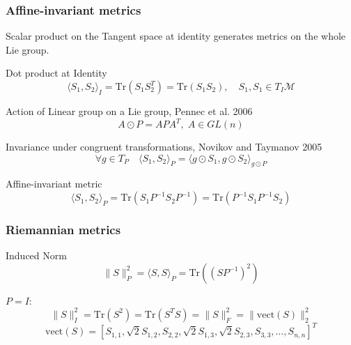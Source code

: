 \documentclass{beamer}
\begin{document}

\begin{frame}
\frametitle{Affine-invariant metrics}
Scalar product on the Tangent space at identity generates metrics on the whole Lie group. 
\begin{block}{Dot product at Identity}
	\begin{equation*}
	\langle S_1, S_2 \rangle_I = \text{Tr}(S_1 S_2^T) = \text{Tr}(S_1 S_2), \quad S_1, S_1 \in T_I \mathcal{M}
	\end{equation*}
\end{block}

\begin{block}{Action of Linear group on a Lie group, Pennec et al. 2006}
	\begin{equation*}
	 A \odot P = A P A^T, \; A\in GL(n)
	\end{equation*}
\end{block}

\begin{block}{Invariance under congruent transformations, Novikov and Taymanov 2005}
	\begin{equation*}
	\forall g \in T_P \quad 
	 \langle S_1, S_2 \rangle_P =  \langle g \odot S_1,g\odot  S_2 \rangle_{g \odot P}
	\end{equation*}
\end{block}

\begin{block}{Affine-invariant metric}
	\begin{equation*}
	\langle S_1, S_2 \rangle_P = \text{Tr}(S_1 P^{-1}S_2 P^{-1}) = \text{Tr}(P^{-1}S_1 P^{-1}S_2)
	\end{equation*}
\end{block}
\end{frame}


\begin{frame}
\frametitle{Riemannian metrics}
\begin{block}{Induced Norm}
	\begin{equation*}
	\|S \|_P^2 = 	\langle S, S \rangle_P  = \text{Tr}((S P^{-1})^2)
	\end{equation*}
\end{block}

$P = I:$
\begin{equation*}
\|S\|_I^2 = \text{Tr}(S^2) =  \text{Tr}(S^TS) = \|S\|_F^2 = \|\text{vect}(S)\|_2^2
\end{equation*}
\begin{equation*}
\text{vect}(S) = \left[ S_{1,1}, \sqrt{2}S_{1,2}, S_{2,2}, \sqrt{2}S_{1,3} ,  \sqrt{2}S_{2,3}, S_{3,3}, \dots, S_{n,n}  \right]^T
\end{equation*}

\end{frame}
\end{document}
